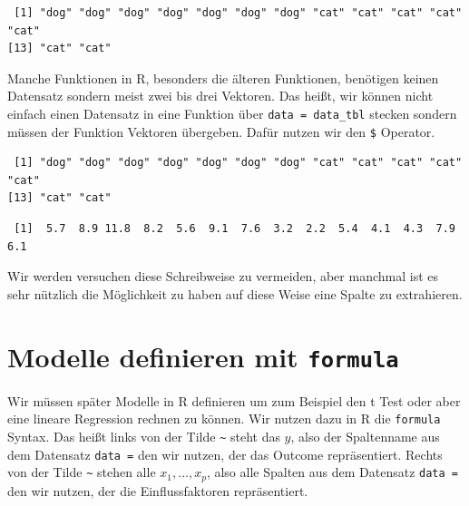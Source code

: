 \documentclass[
  letterpaper,
]{scrbook}
\newenvironment{Shaded}{\begin{snugshade}}{\end{snugshade}}
\newcommand{\NormalTok}[1]{\textcolor[rgb]{0.00,0.23,0.31}{#1}}
\newcommand{\SpecialCharTok}[1]{\textcolor[rgb]{0.37,0.37,0.37}{#1}}
\begin{document}
\begin{verbatim}
 [1] "dog" "dog" "dog" "dog" "dog" "dog" "dog" "cat" "cat" "cat" "cat" "cat"
[13] "cat" "cat"
\end{verbatim}

Manche Funktionen in R, besonders die älteren Funktionen, benötigen
keinen Datensatz sondern meist zwei bis drei Vektoren. Das heißt, wir
können nicht einfach einen Datensatz in eine Funktion über
\texttt{data\ =\ data\_tbl} stecken sondern müssen der Funktion Vektoren
übergeben. Dafür nutzen wir den \texttt{\$} Operator.

\begin{Shaded}
\end{Shaded}

\begin{verbatim}
 [1] "dog" "dog" "dog" "dog" "dog" "dog" "dog" "cat" "cat" "cat" "cat" "cat"
[13] "cat" "cat"
\end{verbatim}

\begin{Shaded}
\end{Shaded}

\begin{verbatim}
 [1]  5.7  8.9 11.8  8.2  5.6  9.1  7.6  3.2  2.2  5.4  4.1  4.3  7.9  6.1
\end{verbatim}

Wir werden versuchen diese Schreibweise zu vermeiden, aber manchmal ist
es sehr nützlich die Möglichkeit zu haben auf diese Weise eine Spalte zu
extrahieren.

\hypertarget{sec-formula}{%
\section{\texorpdfstring{Modelle definieren mit
\texttt{formula}}{Modelle definieren mit formula}}\label{sec-formula}}

Wir müssen später Modelle in R definieren um zum Beispiel den t Test
oder aber eine lineare Regression rechnen zu können. Wir nutzen dazu in
R die \texttt{formula} Syntax. Das heißt links von der Tilde
\texttt{\textasciitilde{}} steht das \(y\), also der Spaltenname aus dem
Datensatz \texttt{data\ =} den wir nutzen, der das Outcome
repräsentiert. Rechts von der Tilde \texttt{\textasciitilde{}} stehen
alle \(x_1, ..., x_p\), also alle Spalten aus dem Datensatz
\texttt{data\ =} den wir nutzen, der die Einflussfaktoren repräsentiert.
\end{document}
